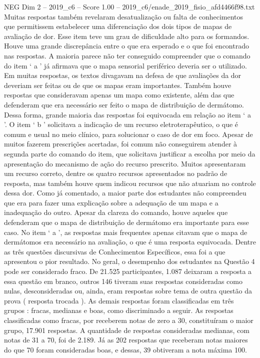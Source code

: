 \begin{textsample}{NEG Dim 2 – 2019\_c6 – Score 1.00 – 2019\_c6/enade\_2019\_fisio\_afd4466f98.txt}
Muitas respostas também revelaram desatualização ou falta de conhecimentos que permitissem estabelecer uma diferenciação dos dois tipos de mapas de avaliação de dor.
Esse item teve um grau de dificuldade alto para os formandos.
Houve uma grande discrepância entre o que era esperado e o que foi encontrado nas respostas.
A maioria parece não ter conseguido compreender que o comando do item ‘ a ’ já afirmava que o mapa sensorial periférico deveria ser o utilizado.
Em muitas respostas, os textos divagavam na defesa de que avaliações da dor deveriam ser feitas ou de que os mapas eram importantes.
Também houve respostas que consideravam apenas um mapa como existente, além das que defenderam que era necessário ser feito o mapa de distribuição de dermátomo.
Dessa forma, grande maioria das respostas foi equivocada em relação ao item ‘ a ’.
O item ‘ b ’ solicitava a indicação de um recurso eletroterapêutico, o que é comum e usual no meio clínico, para solucionar o caso de dor em foco.
Apesar de muitos fazerem prescrições acertadas, foi comum não conseguirem atender à segunda parte do comando do item, que solicitava justificar a escolha por meio da apresentação do mecanismo de ação do recurso prescrito.
Muitos apresentaram um recurso correto, dentre os quatro recursos apresentados no padrão de resposta, mas também houve quem indicou recursos que não atuariam no controle dessa dor.
Como já comentado, a maior parte dos estudantes não compreendeu que era para fazer uma explicação sobre a adequação de um mapa e a inadequação do outro.
Apesar da clareza do comando, houve aqueles que defenderam que o mapa de distribuição de dermátomo era importante para esse caso.
No item ‘ a ’, as respostas mais frequentes apenas citavam que o mapa de dermátomos era necessário na avaliação, o que é uma resposta equivocada.
Dentre as três questões discursivas de Conhecimentos Específicos, essa foi a que apresentou o pior resultado.
No geral, o desempenho dos estudantes na Questão 4 pode ser considerado fraco.
De 21.525 participantes, 1.087 deixaram a resposta a essa questão em branco, outros 146 tiveram suas respostas consideradas como nulas, desconsideradas ou, ainda, eram respostas sobre tema de outra questão da prova ( resposta trocada ).
As demais respostas foram classificadas em três grupos : fracas, medianas e boas, como discriminado a seguir.
As respostas classificadas como fracas, por receberem notas de zero a 30, constituíram o maior grupo, 17.901 respostas.
A quantidade de respostas consideradas medianas, com notas de 31 a 70, foi de 2.189.
Já as 202 respostas que receberam notas maiores do que 70 foram consideradas boas, e dessas, 39 obtiveram a nota máxima 100.

\end{textsample}
